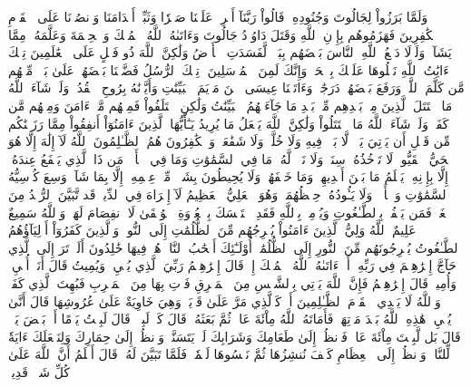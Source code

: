 وَلَمَّا بَرَزُواْ لِجَالُوتَ وَجُنُودِهِۦ قَالُواْ رَبَّنَآ أَفۡرِغۡ عَلَيۡنَا صَبۡرٗا وَثَبِّتۡ أَقۡدَامَنَا وَٱنصُرۡنَا عَلَى ٱلۡقَوۡمِ ٱلۡكَٰفِرِينَ
فَهَزَمُوهُم بِإِذۡنِ ٱللَّهِ وَقَتَلَ دَاوُۥدُ جَالُوتَ وَءَاتَىٰهُ ٱللَّهُ ٱلۡمُلۡكَ وَٱلۡحِكۡمَةَ وَعَلَّمَهُۥ مِمَّا يَشَآءُۗ وَلَوۡلَا دَفۡعُ ٱللَّهِ ٱلنَّاسَ بَعۡضَهُم بِبَعۡضٖ لَّفَسَدَتِ ٱلۡأَرۡضُ وَلَٰكِنَّ ٱللَّهَ ذُو فَضۡلٍ عَلَى ٱلۡعَٰلَمِينَ
تِلۡكَ ءَايَٰتُ ٱللَّهِ نَتۡلُوهَا عَلَيۡكَ بِٱلۡحَقِّۚ وَإِنَّكَ لَمِنَ ٱلۡمُرۡسَلِينَ
۞تِلۡكَ ٱلرُّسُلُ فَضَّلۡنَا بَعۡضَهُمۡ عَلَىٰ بَعۡضٖۘ مِّنۡهُم مَّن كَلَّمَ ٱللَّهُۖ وَرَفَعَ بَعۡضَهُمۡ دَرَجَٰتٖۚ وَءَاتَيۡنَا عِيسَى ٱبۡنَ مَرۡيَمَ ٱلۡبَيِّنَٰتِ وَأَيَّدۡنَٰهُ بِرُوحِ ٱلۡقُدُسِۗ وَلَوۡ شَآءَ ٱللَّهُ مَا ٱقۡتَتَلَ ٱلَّذِينَ مِنۢ بَعۡدِهِم مِّنۢ بَعۡدِ مَا جَآءَتۡهُمُ ٱلۡبَيِّنَٰتُ وَلَٰكِنِ ٱخۡتَلَفُواْ فَمِنۡهُم مَّنۡ ءَامَنَ وَمِنۡهُم مَّن كَفَرَۚ وَلَوۡ شَآءَ ٱللَّهُ مَا ٱقۡتَتَلُواْ وَلَٰكِنَّ ٱللَّهَ يَفۡعَلُ مَا يُرِيدُ
يَـٰٓأَيُّهَا ٱلَّذِينَ ءَامَنُوٓاْ أَنفِقُواْ مِمَّا رَزَقۡنَٰكُم مِّن قَبۡلِ أَن يَأۡتِيَ يَوۡمٞ لَّا بَيۡعٞ فِيهِ وَلَا خُلَّةٞ وَلَا شَفَٰعَةٞۗ وَٱلۡكَٰفِرُونَ هُمُ ٱلظَّـٰلِمُونَ
ٱللَّهُ لَآ إِلَٰهَ إِلَّا هُوَ ٱلۡحَيُّ ٱلۡقَيُّومُۚ لَا تَأۡخُذُهُۥ سِنَةٞ وَلَا نَوۡمٞۚ لَّهُۥ مَا فِي ٱلسَّمَٰوَٰتِ وَمَا فِي ٱلۡأَرۡضِۗ مَن ذَا ٱلَّذِي يَشۡفَعُ عِندَهُۥٓ إِلَّا بِإِذۡنِهِۦۚ يَعۡلَمُ مَا بَيۡنَ أَيۡدِيهِمۡ وَمَا خَلۡفَهُمۡۖ وَلَا يُحِيطُونَ بِشَيۡءٖ مِّنۡ عِلۡمِهِۦٓ إِلَّا بِمَا شَآءَۚ وَسِعَ كُرۡسِيُّهُ ٱلسَّمَٰوَٰتِ وَٱلۡأَرۡضَۖ وَلَا يَـُٔودُهُۥ حِفۡظُهُمَاۚ وَهُوَ ٱلۡعَلِيُّ ٱلۡعَظِيمُ
لَآ إِكۡرَاهَ فِي ٱلدِّينِۖ قَد تَّبَيَّنَ ٱلرُّشۡدُ مِنَ ٱلۡغَيِّۚ فَمَن يَكۡفُرۡ بِٱلطَّـٰغُوتِ وَيُؤۡمِنۢ بِٱللَّهِ فَقَدِ ٱسۡتَمۡسَكَ بِٱلۡعُرۡوَةِ ٱلۡوُثۡقَىٰ لَا ٱنفِصَامَ لَهَاۗ وَٱللَّهُ سَمِيعٌ عَلِيمٌ
ٱللَّهُ وَلِيُّ ٱلَّذِينَ ءَامَنُواْ يُخۡرِجُهُم مِّنَ ٱلظُّلُمَٰتِ إِلَى ٱلنُّورِۖ وَٱلَّذِينَ كَفَرُوٓاْ أَوۡلِيَآؤُهُمُ ٱلطَّـٰغُوتُ يُخۡرِجُونَهُم مِّنَ ٱلنُّورِ إِلَى ٱلظُّلُمَٰتِۗ أُوْلَـٰٓئِكَ أَصۡحَٰبُ ٱلنَّارِۖ هُمۡ فِيهَا خَٰلِدُونَ
أَلَمۡ تَرَ إِلَى ٱلَّذِي حَآجَّ إِبۡرَٰهِـۧمَ فِي رَبِّهِۦٓ أَنۡ ءَاتَىٰهُ ٱللَّهُ ٱلۡمُلۡكَ إِذۡ قَالَ إِبۡرَٰهِـۧمُ رَبِّيَ ٱلَّذِي يُحۡيِۦ وَيُمِيتُ قَالَ أَنَا۠ أُحۡيِۦ وَأُمِيتُۖ قَالَ إِبۡرَٰهِـۧمُ فَإِنَّ ٱللَّهَ يَأۡتِي بِٱلشَّمۡسِ مِنَ ٱلۡمَشۡرِقِ فَأۡتِ بِهَا مِنَ ٱلۡمَغۡرِبِ فَبُهِتَ ٱلَّذِي كَفَرَۗ وَٱللَّهُ لَا يَهۡدِي ٱلۡقَوۡمَ ٱلظَّـٰلِمِينَ
أَوۡ كَٱلَّذِي مَرَّ عَلَىٰ قَرۡيَةٖ وَهِيَ خَاوِيَةٌ عَلَىٰ عُرُوشِهَا قَالَ أَنَّىٰ يُحۡيِۦ هَٰذِهِ ٱللَّهُ بَعۡدَ مَوۡتِهَاۖ فَأَمَاتَهُ ٱللَّهُ مِاْئَةَ عَامٖ ثُمَّ بَعَثَهُۥۖ قَالَ كَمۡ لَبِثۡتَۖ قَالَ لَبِثۡتُ يَوۡمًا أَوۡ بَعۡضَ يَوۡمٖۖ قَالَ بَل لَّبِثۡتَ مِاْئَةَ عَامٖ فَٱنظُرۡ إِلَىٰ طَعَامِكَ وَشَرَابِكَ لَمۡ يَتَسَنَّهۡۖ وَٱنظُرۡ إِلَىٰ حِمَارِكَ وَلِنَجۡعَلَكَ ءَايَةٗ لِّلنَّاسِۖ وَٱنظُرۡ إِلَى ٱلۡعِظَامِ كَيۡفَ نُنشِزُهَا ثُمَّ نَكۡسُوهَا لَحۡمٗاۚ فَلَمَّا تَبَيَّنَ لَهُۥ قَالَ أَعۡلَمُ أَنَّ ٱللَّهَ عَلَىٰ كُلِّ شَيۡءٖ قَدِيرٞ
